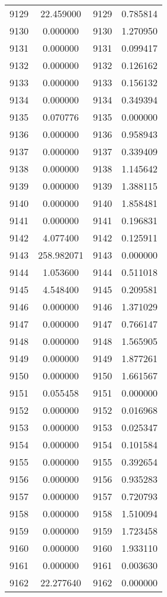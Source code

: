 \documentclass[12pt]{article}
\begin{document}
\begin{longtable}{@{}cccc@{}}
9129 & 22.459000 & 9129 & 0.785814 \\
9130 & 0.000000 & 9130 & 1.270950 \\
9131 & 0.000000 & 9131 & 0.099417 \\
9132 & 0.000000 & 9132 & 0.126162 \\
9133 & 0.000000 & 9133 & 0.156132 \\
9134 & 0.000000 & 9134 & 0.349394 \\
9135 & 0.070776 & 9135 & 0.000000 \\
9136 & 0.000000 & 9136 & 0.958943 \\
9137 & 0.000000 & 9137 & 0.339409 \\
9138 & 0.000000 & 9138 & 1.145642 \\
9139 & 0.000000 & 9139 & 1.388115 \\
9140 & 0.000000 & 9140 & 1.858481 \\
9141 & 0.000000 & 9141 & 0.196831 \\
9142 & 4.077400 & 9142 & 0.125911 \\
9143 & 258.982071 & 9143 & 0.000000 \\
9144 & 1.053600 & 9144 & 0.511018 \\
9145 & 4.548400 & 9145 & 0.209581 \\
9146 & 0.000000 & 9146 & 1.371029 \\
9147 & 0.000000 & 9147 & 0.766147 \\
9148 & 0.000000 & 9148 & 1.565905 \\
9149 & 0.000000 & 9149 & 1.877261 \\
9150 & 0.000000 & 9150 & 1.661567 \\
9151 & 0.055458 & 9151 & 0.000000 \\
9152 & 0.000000 & 9152 & 0.016968 \\
9153 & 0.000000 & 9153 & 0.025347 \\
9154 & 0.000000 & 9154 & 0.101584 \\
9155 & 0.000000 & 9155 & 0.392654 \\
9156 & 0.000000 & 9156 & 0.935283 \\
9157 & 0.000000 & 9157 & 0.720793 \\
9158 & 0.000000 & 9158 & 1.510094 \\
9159 & 0.000000 & 9159 & 1.723458 \\
9160 & 0.000000 & 9160 & 1.933110 \\
9161 & 0.000000 & 9161 & 0.003630 \\
9162 & 22.277640 & 9162 & 0.000000 \\

\end{longtable}
\end{document}
